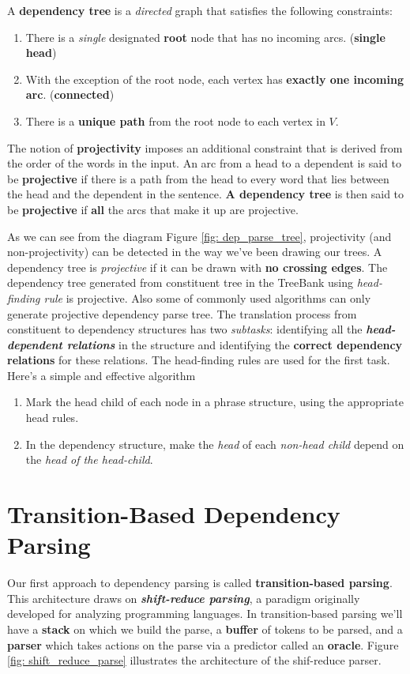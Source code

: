 \documentclass[11pt]{article}
\begin{document}
A \textbf{dependency tree} is a \emph{directed} graph that satisfies the following constraints:
\begin{enumerate}
\item There is a \emph{single} designated \textbf{root} node that has no incoming arcs. (\textbf{single head})
\item With the exception of the root node, each vertex has \textbf{exactly one incoming arc}. (\textbf{connected})
\item There is a \textbf{unique path} from the root node to each vertex in $V$.
\end{enumerate}

The notion of \textbf{projectivity} imposes an additional constraint that is derived from the order of the words in the input.  An arc from a head to a dependent is said to be
\textbf{projective}  if there is a path from the head to every word that lies between the head and the dependent in the sentence.  \textbf{A dependency tree} is then said to be \textbf{projective} if \textbf{all} the arcs that make it up are projective.

As we can see from the diagram Figure \ref{fig: dep_parse_tree}, projectivity (and non-projectivity) can be detected in the way we’ve
been drawing our trees. A dependency tree is \emph{projective} if it can be drawn with \textbf{no crossing edges}. The dependency tree generated from constituent tree in the TreeBank using \emph{head-finding rule} is projective. Also some of commonly used algorithms can only generate projective dependency parse tree. 
The translation process from constituent to dependency structures has two \emph{subtasks}: identifying all the \emph{\textbf{head-dependent relations}} in the structure and identifying the \textbf{correct dependency relations} for these relations. The head-finding rules are used for the first task. Here’s a simple and effective algorithm
\begin{enumerate}
\item Mark the head child of each node in a phrase structure, using the appropriate head rules.
\item In the dependency structure, make the \emph{head} of each \emph{non-head child} depend on the \emph{head of the head-child}.
\end{enumerate}

\section{Transition-Based Dependency Parsing}
Our first approach to dependency parsing is called \textbf{transition-based parsing}. This architecture draws on \textbf{\emph{shift-reduce parsing}}, a paradigm originally developed for analyzing programming languages. In transition-based parsing we’ll have a \textbf{stack} on which we build the parse, a \textbf{buffer} of tokens to be
parsed, and a \textbf{parser} which takes actions on the parse via a predictor called an \textbf{oracle}. Figure \ref{fig: shift_reduce_parse} illustrates the architecture of the shif-reduce parser. 
\end{document}
